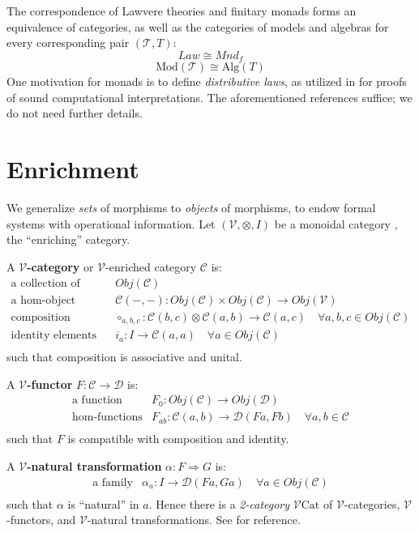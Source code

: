 \documentclass[a4paper,UKenglish]{article}
\theoremstyle{definition}
\newcommand{\Cat}{\mathrm{Cat}}
\newcommand{\Mod}{\mathrm{Mod}}
\newcommand{\Alg}{\mathrm{Alg}}
\newcommand{\V}{\mathscr{V}}
\newcommand{\C}{\mathscr{C}}
\newcommand{\D}{\mathscr{D}}
\newcommand{\T}{\mathscr{T}}
\begin{document}
The correspondence of Lawvere theories and finitary monads forms an equivalence of categories, as well as the categories of models and algebras for every corresponding pair $(\T, T)$: $$Law \cong Mnd_f$$ $$\Mod(\T) \cong \Alg(T)$$ One motivation for monads is to define \textit{distributive laws}, as utilized in \cite{ladl} for proofs of sound computational interpretations. The aforementioned references suffice; we do not need further details. 

\section{Enrichment}
We generalize \textit{sets} of morphisms to \textit{objects} of morphisms, to endow formal systems with operational information. Let $(\V,\otimes,I)$ be a monoidal category \cite{maclane}, the ``enriching'' category.

A \textbf{$\V$-category} or $\V$-enriched category $\C$ is:
\[\begin{array}{rl}
\text{a collection of objects} & Obj(\C)\\
\text{a hom-object function} & \C(-,-):Obj(\C) \times Obj(\C) \to Obj(\V)\\
\text{composition morphisms} & \circ_{a,b,c}:\C(b,c) \otimes \C(a,b) \to \C(a,c) \quad \forall a,b,c \in Obj(\C)\\
\text{identity elements} & i_a:I\to\C(a,a) \quad \forall a \in Obj(\C)\\
\end{array}\]
such that composition is associative and unital.

A \textbf{$\V$-functor} $F:\C \to \D$ is:
\[\begin{array}{rl}
\text{a function} & F_0: Obj(\C) \to Obj(\D)\\
\text{hom-functions} & F_{ab}: \C(a,b) \to \D(Fa,Fb) \quad \forall a,b \in \C\\
\end{array}\]
such that $F$ is compatible with composition and identity.

A \textbf{$\V$-natural transformation} $\alpha: F \Rightarrow G$ is:
\[\begin{array}{rl}
\text{a family} & \alpha_a: I \to \D(Fa,Ga) \quad \forall a \in Obj(\C)\\
\end{array}\]
such that $\alpha$ is ``natural'' in $a$. Hence there is a \textit{2-category} $\V\Cat$ of $\V$-categories, $\V$-functors, and $\V$-natural transformations. See \cite{enrich} for reference.
\end{document}
